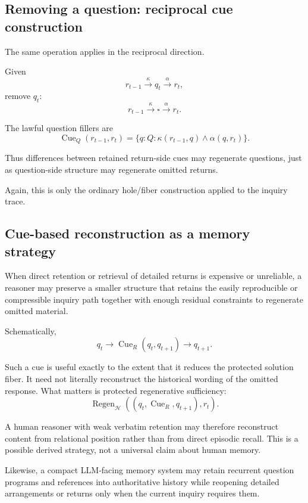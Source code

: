 \subsection{Removing a question: reciprocal cue construction}

The same operation applies in the reciprocal direction.

Given
\[
r_{t-1}\xrightarrow{\kappa}q_t\xrightarrow{\alpha}r_t,
\]
remove \(q_t\):
\[
r_{t-1}\xrightarrow{\kappa}\square\xrightarrow{\alpha}r_t.
\]

The lawful question fillers are
\[
\boxed{
\operatorname{Cue}_Q(r_{t-1},r_t)
=
\{
q:Q:
\kappa(r_{t-1},q)\land\alpha(q,r_t)
\}.
}
\]

Thus differences between retained return-side cues may regenerate questions,
just as question-side structure may regenerate omitted returns.

Again, this is only the ordinary hole/fiber construction applied to the
inquiry trace.

\subsection{Cue-based reconstruction as a memory strategy}

When direct retention or retrieval of detailed returns is expensive or
unreliable, a reasoner may preserve a smaller structure that retains the
easily reproducible or compressible inquiry path together with enough
residual constraints to regenerate omitted material.

Schematically,
\[
q_t
\longrightarrow
\operatorname{Cue}_R(q_t,q_{t+1})
\longrightarrow
q_{t+1}.
\]

Such a cue is useful exactly to the extent that it reduces the protected
solution fiber.  It need not literally reconstruct the historical wording of
the omitted response.  What matters is protected regenerative sufficiency:
\[
\boxed{
\operatorname{Regen}_{\mathcal H}
\left(
(q_t,\operatorname{Cue}_R,q_{t+1}),
r_t
\right).
}
\]

A human reasoner with weak verbatim retention may therefore reconstruct
content from relational position rather than from direct episodic recall.
This is a possible derived strategy, not a universal claim about human memory.

Likewise, a compact LLM-facing memory system may retain recurrent question
programs and references into authoritative history while reopening detailed
arrangements or returns only when the current inquiry requires them.

